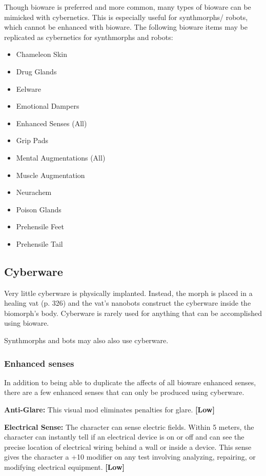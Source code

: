 Though bioware is preferred and more common, many types of bioware can be mimicked with cybernetics. This is especially useful for synthmorphs/ robots, which cannot be enhanced with bioware. The following bioware items may be replicated as cybernetics for synthmorphs and robots: 

\begin{itemize} \item Chameleon Skin \item Drug Glands \item Eelware \item Emotional Dampers \item Enhanced Senses (All) \item Grip Pads \item Mental Augmentations (All) \item Muscle Augmentation \item Neurachem \item Poison Glands \item Prehensile Feet \item Prehensile Tail \end{itemize} 

\subsection{Cyberware} \label{sec:cyberware} 

Very little cyberware is physically implanted. Instead, the morph is placed in a healing vat (p. 326) and the vat’s nanobots construct the cyberware inside the biomorph’s body. Cyberware is rarely used for anything that can be accomplished using bioware. 

Synthmorphs and bots may also also use cyberware. 

\subsubsection{Enhanced senses} 

In addition to being able to duplicate the affects of all bioware enhanced senses, there are a few enhanced senses that can only be produced using cyberware. 

\textbf{Anti-Glare:} This visual mod eliminates penalties for glare. \textbf{[Low]} 

\textbf{Electrical Sense:} The character can sense electric fields. Within 5 meters, the character can instantly tell if an electrical device is on or off and can see the precise location of electrical wiring behind a wall or inside a device. This sense gives the character a +10 modifier on any test involving analyzing, repairing, or modifying electrical equipment. \textbf{[Low]} 

